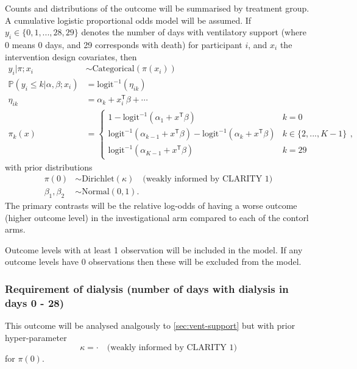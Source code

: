 \documentclass[11pt,parskip=half-]{scrartcl}
\begin{document}
Counts and distributions of the outcome will be summarised by treatment group. A cumulative logistic proportional odds model will be assumed. If $y_i\in\{0,1,...,28,29\}$ denotes the number of days with ventilatory support (where 0 means 0 days, and 29 corresponds with death) for participant $i$, and $x_i$ the intervention design covariates, then
$$
    \begin{aligned}
        y_{i} | \pi;x_i                            & \sim \text{Categorical}(\pi(x_i))           \\
        \mathbb P(y_i \leq k | \alpha, \beta; x_i) & = \text{logit}^{-1}(\eta_{ik})              \\
        \eta_{ik}                                  & = \alpha_k + x_i^{\mathsf{T}}\beta + \cdots \\
        \pi_k(x)                                   & = \begin{cases}
            1 - \text{logit}^{-1}(\alpha_1 + x^\mathsf{T}\beta)                                                     & k=0               \\
            \text{logit}^{-1}(\alpha_{k-1} + x^\mathsf{T}\beta) - \text{logit}^{-1}(\alpha_{k} + x^\mathsf{T}\beta) & k\in\{2,...,K-1\} \\
            \text{logit}^{-1}(\alpha_{K-1} + x^\mathsf{T}\beta)                                                     & k=29
        \end{cases},
    \end{aligned}
$$
with prior distributions
$$
    \begin{aligned}
        \pi(0)          & \sim \text{Dirichlet}(\kappa) \quad \text{(weakly informed by CLARITY 1)} \\
        \beta_1,\beta_2 & \sim \text{Normal}(0, 1).
    \end{aligned}
$$
The primary contrasts will be the relative log-odds of having a worse outcome (higher outcome level) in the investigational arm compared to each of the contorl arms.

Outcome levels with at least 1 observation will be included in the model. If any outcome levels have 0 observations then these will be excluded from the model.

\subsubsection{Requirement of dialysis (number of days with dialysis in days 0 - 28)}

This outcome will be analysed analgously to \ref{sec:vent-support} but with prior hyper-parameter
$$
    \kappa = \cdot \quad \text{(weakly informed by CLARITY 1)}
$$
for $\pi(0)$.
\end{document}
